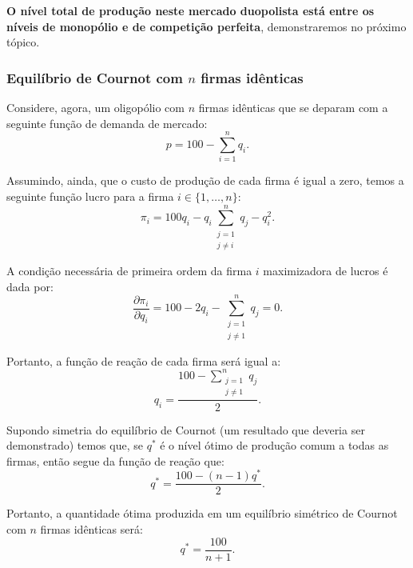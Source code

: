 \documentclass[preprintnumbers,nofootinbib,amsmath,amssymb,12pt]{article}
\begin{document}
\textbf{O nível total de produção neste mercado duopolista está entre os níveis de monopólio e de competição perfeita}, demonstraremos no próximo tópico.

\subsubsection{Equilíbrio de Cournot com $n$ firmas idênticas}

Considere, agora, um oligopólio com $n$ firmas idênticas que se deparam com a seguinte função de demanda de mercado:
\begin{equation}
    p = 100 - \sum_{i=1}^n q_i.
    \label{eq15}
\end{equation}

Assumindo, ainda, que o custo de produção de cada firma é igual a zero, temos a seguinte função lucro para a firma $i \in \{1, \dots, n\}$:
\begin{equation}
    \pi_i = 100q_i - q_i \sum_{\substack{j = 1 \\j \neq i}}^n q_j - q_i^2.
    \label{eq16}
\end{equation}

A condição necessária de primeira ordem da firma $i$ maximizadora de lucros é dada por:
\begin{equation}
    \frac{\partial \pi_i}{\partial q_i} = 100 - 2q_i - \sum_{\substack{j=1\\j\neq 1}}^n q_j = 0.
    \label{eq17}
\end{equation}

Portanto, a função de reação de cada firma será igual a:
\begin{equation}
    q_i = \frac{100 - \sum_{\substack{j=1\\j\neq 1}}^n q_j}{2}.
    \label{eq18}
\end{equation}

Supondo simetria do equilíbrio de Cournot (um resultado que deveria ser demonstrado) temos que, se $q^*$ é o nível ótimo de produção comum a todas as firmas, então segue da função de reação que:
\[
q^* = \frac{100-(n-1)q^*}{2}.
\]

Portanto, a quantidade ótima produzida em um equilíbrio simétrico de Cournot com $n$ firmas idênticas será:
\begin{equation}
    q^* = \frac{100}{n + 1}.
    \label{eq19}
\end{equation}
\end{document}
